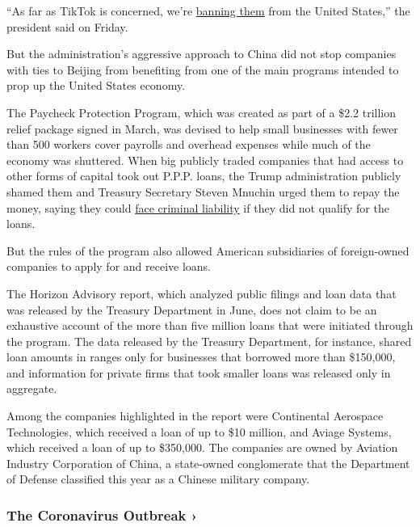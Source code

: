 ``As far as TikTok is concerned, we're
\href{https://www.nytimes.com/2020/08/01/technology/tiktok-trump-microsoft-bytedance-china-ban.html}{banning
them} from the United States,'' the president said on Friday.

But the administration's aggressive approach to China did not stop
companies with ties to Beijing from benefiting from one of the main
programs intended to prop up the United States economy.

The Paycheck Protection Program, which was created as part of a \$2.2
trillion relief package signed in March, was devised to help small
businesses with fewer than 500 workers cover payrolls and overhead
expenses while much of the economy was shuttered. When big publicly
traded companies that had access to other forms of capital took out
P.P.P. loans, the Trump administration publicly shamed them and Treasury
Secretary Steven Mnuchin urged them to repay the money, saying they
could
\href{https://www.nytimes.com/2020/04/28/us/politics/coronavirus-treasury-payment-protection-program.html}{face
criminal liability} if they did not qualify for the loans.

But the rules of the program also allowed American subsidiaries of
foreign-owned companies to apply for and receive loans.

The Horizon Advisory report, which analyzed public filings and loan data
that was released by the Treasury Department in June, does not claim to
be an exhaustive account of the more than five million loans that were
initiated through the program. The data released by the Treasury
Department, for instance, shared loan amounts in ranges only for
businesses that borrowed more than \$150,000, and information for
private firms that took smaller loans was released only in aggregate.

Among the companies highlighted in the report were Continental Aerospace
Technologies, which received a loan of up to \$10 million, and Aviage
Systems, which received a loan of up to \$350,000. The companies are
owned by Aviation Industry Corporation of China, a state-owned
conglomerate that the Department of Defense classified this year as a
Chinese military company.

\href{https://www.nytimes.com/news-event/coronavirus?action=click\&pgtype=Article\&state=default\&region=MAIN_CONTENT_3\&context=storylines_faq}{}

\hypertarget{the-coronavirus-outbreak-}{%
\subsubsection{The Coronavirus Outbreak
›}\label{the-coronavirus-outbreak-}}

